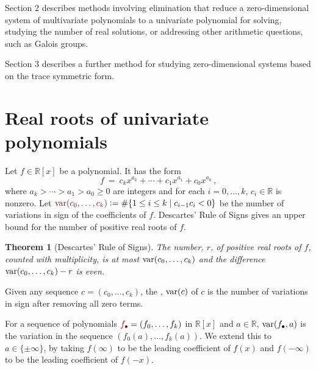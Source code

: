 \documentclass[12pt]{amsart}
\newtheorem{theorem}{Theorem}
\theoremstyle{definition}
\newcommand{\RR}{\mathbb{R}}
\DeclareMathOperator{\var}{{\rm var}}
\newcommand{\defcolor}[1]{{\color{TAMU}#1}}
\newcommand{\demph}[1]{\defcolor{{\sl #1}}}
\begin{document}
Section 2 describes methods involving elimination that reduce a zero-dimensional system of multivariate polynomials to a univariate
polynomial for solving, studying the number of real solutions, or addressing other arithmetic questions, such as Galois groups.

Section 3 describes a further method for studying zero-dimensional systems based on the trace symmetric form.


\section{Real roots of univariate polynomials}\label{S:one}

Let $f\in\RR[x]$ be a polynomial.
It has the form
%
 \[
   f\ =\ c_kx^{a_k}  + \dotsb + c_{1}x^{a_{1}} + c_0x^{a_0}\,,
 \]
%
where $a_k> \dotsb > a_1 > a_0 \geq 0$ are integers and for each $i=0,\dots,k$, $c_{i}\in\RR$ is nonzero.
Let $\defcolor{\var(c_0,\dotsc,c_k)}\vcentcolon=\#\{1\leq i\leq k\mid c_{i-1}c_i<0\}$ be the number of variations in sign of the
coefficients of $f$.
Descartes' Rule of Signs \cite{So_Book} gives an upper bound for the number of positive real roots of $f$.

\begin{theorem}[Descartes' Rule of Signs]
  The number, $r$,  of positive real roots of $f$, counted with multiplicity, is at most $\var(c_0,\dotsc,c_k)$ and the difference
  $\var(c_0,\dotsc,c_k)-r$ is even.
\end{theorem}

Given any sequence $c=(c_0,\dotsc,c_k)$, the \demph{variation},  \defcolor{$\var(c)$} of $c$ is the
number of variations in sign after removing all zero terms.
%
\begin{leftbar}

\end{leftbar}
%
For a sequence of polynomials  $\defcolor{f_\bullet}=(f_0,\dotsc,f_k)$ in $\RR[x]$ and $a\in\RR$, \defcolor{$\var(f_\bullet,a)$} is the
variation in the sequence 
$(f_0(a),\dotsc,f_{k}(a))$. 
We extend this to $a\in\{\pm\infty\}$, by taking $f(\infty)$ to be the leading coefficient of $f(x)$ and $f(-\infty)$ to be the leading
coefficient of $f(-x)$.
\end{document}
